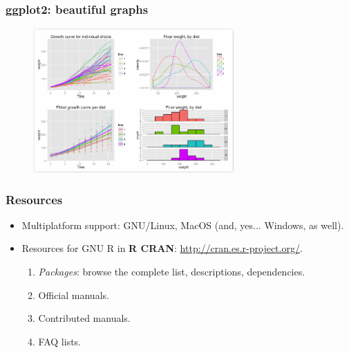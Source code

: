 \documentclass{beamer}
\begin{document}

\begin{frame}[fragile]
  
\frametitle{ggplot2: beautiful graphs}

\begin{figure}
\includegraphics[height=5.5cm]{figs/ggplot2-mult.png}
\end{figure}
\scriptsize{}

\end{frame}


\begin{frame}

\frametitle{Resources}
 \begin{itemize}
  \item Multiplatform support: GNU/Linux, MacOS (and, yes... Windows, as well).
  \item Resources for GNU R in \textbf{R CRAN}:
  \url{http://cran.es.r-project.org/}. 
  \begin{enumerate}
   \item \textit{Packages}: browse the 
   complete list, descriptions, dependencies.
   \item Official manuals.
   \item Contributed manuals.
   \item FAQ lists.
  \end{enumerate}
 \end{itemize}

\end{frame}

\end{document}
